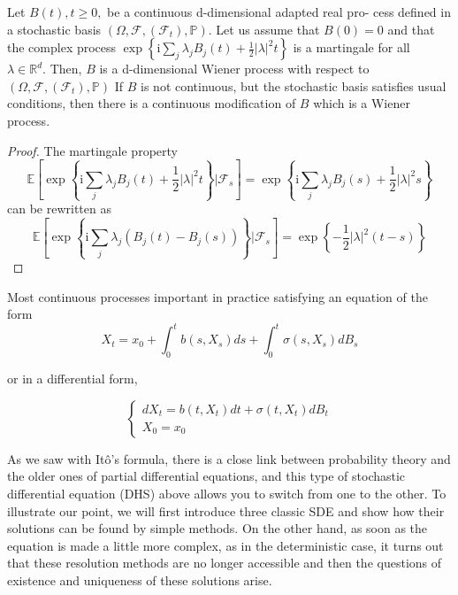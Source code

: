 	\begin{theorem}\label{thm:condition_Brownian_motion}
		Let $B(t), t \geq 0,$ be a continuous d-dimensional adapted real pro-
		cess defined in a stochastic basis $\left(\Omega, \mathcal{F},\left(\mathcal{F}_{t}\right), \mathbb{P}\right) .$ Let us assume that $B(0)=0$ and that the complex process $\operatorname{exp}\left\{\mathrm{i} \sum_{j} \lambda_{j} B_{j}(t)+\frac{1}{2}|\lambda|^{2} t\right\}$ is a martingale for all
		$\lambda \in \mathbb{R}^{d} .$ Then, $B$ is a d-dimensional Wiener process with respect to $\left(\Omega, \mathcal{F},\left(\mathcal{F}_{t}\right), \mathbb{P}\right)$
		If $B$ is not continuous, but the stochastic basis satisfies usual conditions, then there
		is a continuous modification of $B$ which is a Wiener process.
	\end{theorem}
	\begin{proof}
		The martingale property
		$$
		\mathbb{E}\left[\exp \left\{\mathrm{i} \sum_{j} \lambda_{j} B_{j}(t)+\frac{1}{2}|\lambda|^{2} t\right\} | \mathcal{F}_{s}\right]=\exp \left\{\mathrm{i} \sum_{j} \lambda_{j} B_{j}(s)+\frac{1}{2}|\lambda|^{2} s\right\}
		$$
		can be rewritten as
		$$
		\mathbb{E}\left[\exp \left\{\mathrm{i} \sum_{j} \lambda_{j}\left(B_{j}(t)-B_{j}(s)\right)\right\} | \mathcal{F}_{s}\right]=\exp \left\{-\frac{1}{2}|\lambda|^{2}(t-s)\right\}
		$$
	\end{proof}

	Most continuous processes important in practice satisfying an equation of the form
	$$
	X_{t}=x_{0}+\int_{0}^{t} b\left(s, X_{s}\right) d s+\int_{0}^{t} \sigma\left(s, X_{s}\right) d B_{s}
	$$

	or in a differential form,

	$$
	\left\{\begin{array}{l}
	{d X_{t}=b\left(t, X_{t}\right) d t+\sigma\left(t, X_{t}\right) d B_{t}} \\
	{X_{0}=x_{0}}
	\end{array}\right.
	$$

	As we saw with Itô's formula, there is a close link between probability theory and the older ones of partial differential equations, and this type of stochastic differential equation (DHS) above allows you to switch from one to the other. To illustrate our point, we will first introduce three classic SDE and show how their solutions can be found by simple methods. On the other hand, as soon as the equation is made a little more complex, as in the deterministic case, it turns out that these resolution methods are no longer accessible and then the questions of existence and uniqueness of these solutions arise.

